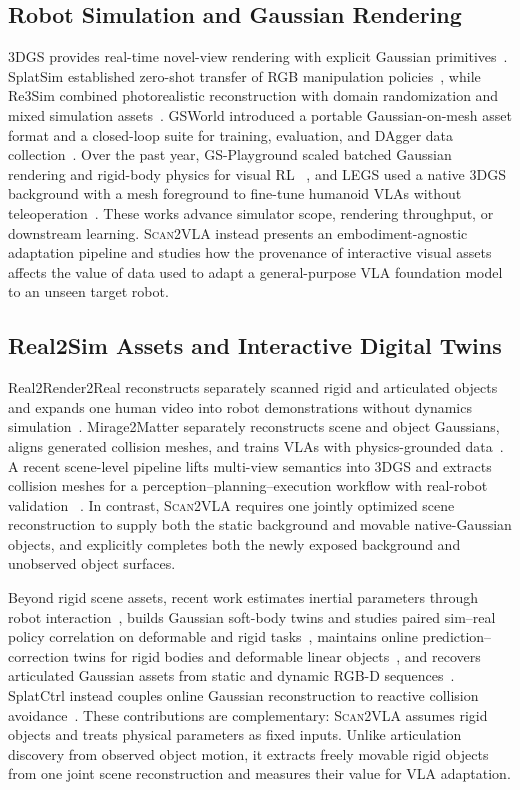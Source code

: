 \documentclass[letterpaper,10pt,conference]{ieeeconf}
\newcommand{\system}{\textsc{Scan2VLA}}
\begin{document}
\subsection{Robot Simulation and Gaussian Rendering}
3DGS provides real-time novel-view rendering with explicit Gaussian
primitives~\cite{kerbl2023gaussians}. SplatSim established zero-shot transfer of
RGB manipulation policies~\cite{qureshi2025splatsim}, while Re3Sim combined
photorealistic reconstruction with domain randomization and mixed simulation
assets~\cite{han2025re3sim}. GSWorld introduced a portable Gaussian-on-mesh asset
format and a closed-loop suite for training, evaluation, and DAgger data
collection~\cite{jiang2025gsworld}. Over the past year, GS-Playground scaled
batched Gaussian rendering and rigid-body physics for visual RL
~\cite{jia2026gsplayground}, and LEGS used a native 3DGS background with a mesh
foreground to fine-tune humanoid VLAs without teleoperation~\cite{kim2026legs}.
These works advance simulator scope, rendering throughput, or downstream
learning. \system{} instead presents an embodiment-agnostic adaptation pipeline
and studies how the provenance of interactive visual assets affects the value of
data used to adapt a general-purpose VLA foundation model to an unseen target
robot.

\subsection{Real2Sim Assets and Interactive Digital Twins}
Real2Render2Real reconstructs separately scanned rigid and articulated objects
and expands one human video into robot demonstrations without dynamics
simulation~\cite{yu2025real2render2real}. Mirage2Matter separately reconstructs
scene and object Gaussians, aligns generated collision meshes, and trains VLAs
with physics-grounded data~\cite{gao2026mirage2matter}. A recent scene-level
pipeline lifts multi-view semantics into 3DGS and extracts collision meshes for
a perception--planning--execution workflow with real-robot validation
~\cite{sun2026digitaltwin}. In contrast, \system{}
requires one jointly optimized scene reconstruction to supply both the static
background and movable native-Gaussian objects, and explicitly completes both
the newly exposed background and unobserved object surfaces.

Beyond rigid scene assets, recent work estimates inertial parameters through
robot interaction~\cite{pfaff2025scalablereal2sim}, builds Gaussian soft-body
twins and studies paired sim--real policy correlation on deformable and rigid
tasks~\cite{zhang2025softbodyeval}, maintains online
prediction--correction twins for rigid bodies and deformable linear
objects~\cite{cai2026gausstwin}, and recovers articulated Gaussian assets from
static and dynamic RGB-D sequences~\cite{mishra2026artitwinsplat}. SplatCtrl instead couples online
Gaussian reconstruction to reactive collision avoidance~\cite{jain2026splatctrl}.
These contributions are complementary: \system{} assumes rigid objects and
treats physical parameters as fixed inputs. Unlike articulation discovery from
observed object motion, it extracts freely movable rigid objects from one joint
scene reconstruction and measures their value for VLA adaptation.
\end{document}
